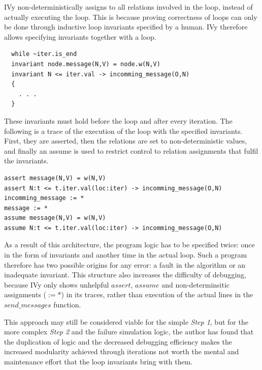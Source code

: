 \documentclass[fleqn]{article}
\begin{document}
IVy non-deterministically assigns to all relations involved in the loop, instead of actually executing the loop.  This is because proving correctness of loops can only be done through inductive loop invariants specified by a human. IVy therefore allows specifying invariants together with a loop.
\begin{mdframed}[backgroundcolor=light-gray, roundcorner=10pt,leftmargin=1, rightmargin=1, innerleftmargin=15, innertopmargin=15,innerbottommargin=15, outerlinewidth=1, linecolor=light-gray]
\begin{lstlisting}
  while ~iter.is_end
  invariant node.message(N,V) = node.w(N,V)
  invariant N <= iter.val -> incomming_message(O,N)
  {
    . . .
  }
\end{lstlisting}
\end{mdframed}

These invariants must hold before the loop and after every iteration. The following is a trace of the execution of the loop with the specified invariants. First, they are asserted, then the relations are set to non-deterministic values, and finally an assume is used to restrict control to relation assignments that fulfil the invariants.

\begin{mdframed}[backgroundcolor=light-gray, roundcorner=10pt,leftmargin=1, rightmargin=1, innerleftmargin=15, innertopmargin=15,innerbottommargin=15, outerlinewidth=1, linecolor=light-gray]
\begin{lstlisting}
assert message(N,V) = w(N,V)
assert N:t <= t.iter.val(loc:iter) -> incomming_message(O,N)
incomming_message := *
message := *
assume message(N,V) = w(N,V)
assume N:t <= t.iter.val(loc:iter) -> incomming_message(O,N)
\end{lstlisting}
\end{mdframed}

As a result of this architecture, the program logic has to be specified twice: once in the form of invariants and another time in the actual loop. Such a program therefore has two possible origins for any error: a fault in the algorithm or an inadequate invariant. This structure also increases the difficulty of debugging, because IVy only shows unhelpful $assert$, $assume$ and  non-determinsitic assignments ($:= *$) in its traces, rather than execution of the actual lines in the $send\_messages$ function.

This approach may still be considered viable for the simple \textit{Step 1}, but for the more complex \textit{Step 2} and the failure simulation logic, the author has found that the duplication of logic and the decreased debugging efficiency makes the increased modularity achieved through iterations not worth the mental and maintenance effort that the loop invariants bring with them.
\end{document}
